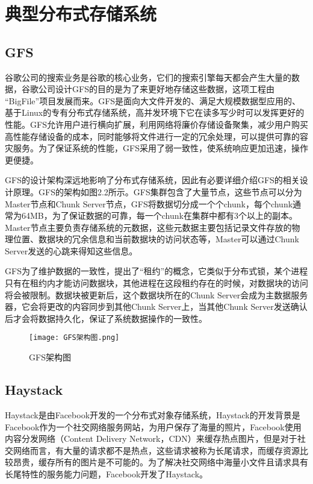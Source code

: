 \section{典型分布式存储系统}%
\subsection{GFS}%
谷歌公司的搜索业务是谷歌的核心业务，它们的搜索引擎每天都会产生大量的数据，谷歌公司设计GFS的目的是为了来更好地存储这些数据，这项工程由 “BigFile”项目发展而来。GFS是面向大文件开发的、满足大规模数据型应用的、基于Linux的专有分布式存储系统，高并发环境下它在读多写少时可以发挥更好的性能。GFS允许用户进行横向扩展，利用网络将廉价存储设备聚集，减少用户购买高性能存储设备的成本，同时能够将文件进行一定的冗余处理，可以提供可靠的容灾服务。为了保证系统的性能，GFS采用了弱一致性，使系统响应更加迅速，操作更便捷。

GFS的设计架构深远地影响了分布式存储系统，因此有必要详细介绍GFS的相关设计原理。GFS的架构如图2.2所示。GFS集群包含了大量节点，这些节点可以分为Master节点和Chunk Server节点，GFS将数据切分成一个个chunk，每个chunk通常为64MB，为了保证数据的可靠，每一个chunk在集群中都有3个以上的副本\cite{36}。Master节点主要负责存储系统的元数据，这些元数据主要包括记录文件存放的物理位置、数据块的冗余信息和当前数据块的访问状态等，Master可以通过Chunk Server发送的心跳来得知这些信息。

GFS为了维护数据的一致性，提出了“租约”的概念，它类似于分布式锁，某个进程只有在租约内才能访问数据块，其他进程在这段租约存在的时候，对数据块的访问将会被限制。数据块被更新后，这个数据块所在的Chunk Server会成为主数据服务器，它会将更改的内容同步到其他Chunk Server上，当其他Chunk Server发送确认后才会将数据持久化，保证了系统数据操作的一致性。

\begin{figure}
    \centering
    \texttt{[image: GFS架构图.png]}
    \caption{GFS架构图}
\end{figure}

\subsection{Haystack}%
Haystack是由Facebook开发的一个分布式对象存储系统，Haystack的开发背景是Facebook作为一个社交网络服务网站，为用户保存了海量的照片，Facebook使用内容分发网络（Content Delivery Network，CDN）来缓存热点图片，但是对于社交网络而言，有大量的请求都不是热点，这些请求被称为长尾请求，而缓存资源比较昂贵，缓存所有的图片是不可能的。为了解决社交网络中海量小文件且请求具有长尾特性的服务能力问题，Facebook开发了Haystack。


